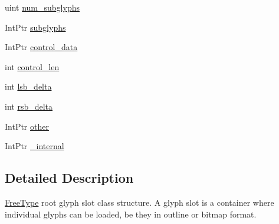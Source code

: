\begin{DoxyCompactItemize}
\item 
uint \hyperlink{struct_tao_1_1_free_type_1_1_f_t___glyph_slot_rec_a2733a8b57dc21fa64c3fd382233531ff}{num\_\-subglyphs}
\item 
IntPtr \hyperlink{struct_tao_1_1_free_type_1_1_f_t___glyph_slot_rec_affc78523d60cf49592bd61747ce4c13a}{subglyphs}
\item 
IntPtr \hyperlink{struct_tao_1_1_free_type_1_1_f_t___glyph_slot_rec_a97a078a7227e5dd3cfa686fd1606ca12}{control\_\-data}
\item 
int \hyperlink{struct_tao_1_1_free_type_1_1_f_t___glyph_slot_rec_a63f0498095c09111f1f40388e70e03d3}{control\_\-len}
\item 
int \hyperlink{struct_tao_1_1_free_type_1_1_f_t___glyph_slot_rec_aa21ed8048a0785fc57c6a74af937ae2f}{lsb\_\-delta}
\item 
int \hyperlink{struct_tao_1_1_free_type_1_1_f_t___glyph_slot_rec_ad119b509552f357b2cdc777a4ec4bc23}{rsb\_\-delta}
\item 
IntPtr \hyperlink{struct_tao_1_1_free_type_1_1_f_t___glyph_slot_rec_a139d874646b86b377e289f52efa01d4d}{other}
\item 
IntPtr \hyperlink{struct_tao_1_1_free_type_1_1_f_t___glyph_slot_rec_a904d1911fa5b5e43d2489a18caf1d389}{\_\-internal}
\end{DoxyCompactItemize}


\subsection{Detailed Description}
\hyperlink{namespace_tao_1_1_free_type}{FreeType} root glyph slot class structure. A glyph slot is a container where individual glyphs can be loaded, be they in outline or bitmap format. 


